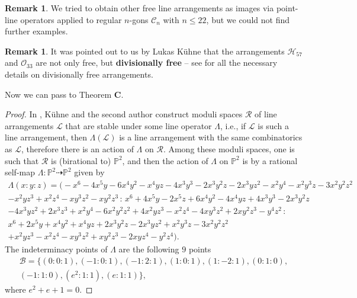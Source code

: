 \documentclass[11pt]{article}
\theoremstyle{plain}
\theoremstyle{definition}
\newtheorem{remark}[thm]{Remark}
\theoremstyle{plain}
\renewcommand\leq{\leqslant}
\newcommand\calc{{\mathcal C}}
\begin{document}
\begin{remark}
We tried to obtain other free line arrangements as images via point-line 
operators applied to regular $n$-gons $\calc_n$ with $n\leq 22$, but we could not find further examples. 
\begin{remark}
It was pointed out to us by Lukas K\"uhne that the arrangements $\mathcal{H}_{57}$ and $\mathcal{O}_{33}$ are not only free, but \textbf{divisionally free} -- see \cite{Abe} for all the necessary details on divisionally free arrangements.
\end{remark}
\end{remark}
Now we can pass to Theorem \textbf{C}.
\begin{proof}
In \cite{KR}, K\"uhne and the second author construct moduli spaces $\mathcal{R}$ of 
line arrangements $\mathcal{L}$ that are stable under some line operator $\Lambda$, i.e., 
if $\mathcal{L}$ is such a line arrangement, then $\Lambda(\mathcal{L})$ is a line arrangement
with the same combinatorics as $\mathcal{L}$, therefore there is an action of $\Lambda$ on $\mathcal{R}$. 
Among these moduli spaces, one is such that $\mathcal{R}$ is (birational 
to) $\mathbb{P}^2$, and then the action of $\Lambda$ on $\mathbb{P}^2$ is
by a rational self-map $\Lambda:\mathbb{P}^{2}\dashrightarrow \mathbb{P}^{2}$
given by {\footnotesize{}
\begin{equation}
\begin{array}{c}
\Lambda(x:y:z)=\bigg(-x^{6}-4x^{5}y-6x^{4}y^{2}-x^{4}yz-4x^{3}y^{3}-2x^{3}y^{2}z-2x^{3}yz^{2}-x^{2}y^{4}-x^{2}y^{3}z-3x^{2}y^{2}z^{2}\\
-x^{2}yz^{3}+x^{2}z^{4}-xy^{3}z^{2}-xy^{2}z^{3}\,:\,x^{6}+4x^{5}y-2x^{5}z+6x^{4}y^{2}-4x^{4}yz+4x^{3}y^{3}-2x^{3}y^{2}z\\
-4x^{3}yz^{2}+2x^{3}z^{3}+x^{2}y^{4}-6x^{2}y^{2}z^{2}+4x^{2}yz^{3}-x^{2}z^{4}-4xy^{3}z^{2}+2xy^{2}z^{3}-y^{4}z^{2}\,:\,\\
x^{6}+2x^{5}y+x^{4}y^{2}+x^{4}yz+2x^{3}y^{2}z-2x^{3}yz^{2}+x^{2}y^{3}z-3x^{2}y^{2}z^{2}\\
+x^{2}yz^{3}-x^{2}z^{4}-xy^{3}z^{2}+xy^{2}z^{3}-2xyz^{4}-y^{2}z^{4}\bigg).
\end{array}
\end{equation}
}
The indeterminacy points of $\Lambda$ are the following  $9$ points 
\begin{multline*}
 \mathcal{B} = \{(0:0:1), (-1:0:1), (-1:2:1), (1:0:1), (1:-2:1), (0:1:0), \\ (-1:1:0), (e^{2}:1:1), (e:1:1)\},   
\end{multline*}
where $e^{2}+e+1=0$.


\end{proof}
\end{document}
